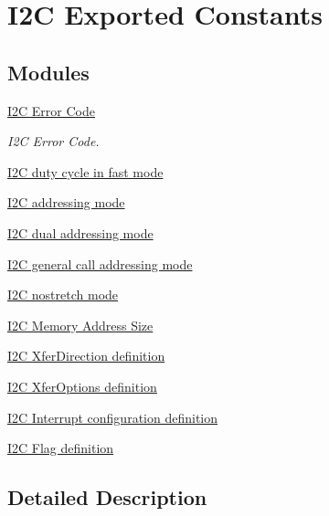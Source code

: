 \hypertarget{group___i2_c___exported___constants}{}\section{I2C Exported Constants}
\label{group___i2_c___exported___constants}
\subsection*{Modules}
\begin{DoxyCompactItemize}
\item 
\hyperlink{group___i2_c___error___code}{I2\+C Error Code}
\begin{DoxyCompactList}\small\item\em I2C Error Code. \end{DoxyCompactList}\item 
\hyperlink{group___i2_c__duty__cycle__in__fast__mode}{I2\+C duty cycle in fast mode}
\item 
\hyperlink{group___i2_c__addressing__mode}{I2\+C addressing mode}
\item 
\hyperlink{group___i2_c__dual__addressing__mode}{I2\+C dual addressing mode}
\item 
\hyperlink{group___i2_c__general__call__addressing__mode}{I2\+C general call addressing mode}
\item 
\hyperlink{group___i2_c__nostretch__mode}{I2\+C nostretch mode}
\item 
\hyperlink{group___i2_c___memory___address___size}{I2\+C Memory Address Size}
\item 
\hyperlink{group___i2_c___xfer_direction__definition}{I2\+C Xfer\+Direction definition}
\item 
\hyperlink{group___i2_c___xfer_options__definition}{I2\+C Xfer\+Options definition}
\item 
\hyperlink{group___i2_c___interrupt__configuration__definition}{I2\+C Interrupt configuration definition}
\item 
\hyperlink{group___i2_c___flag__definition}{I2\+C Flag definition}
\end{DoxyCompactItemize}


\subsection{Detailed Description}
